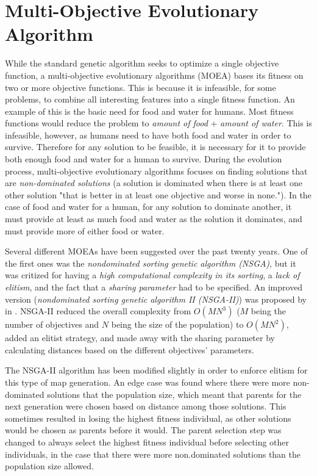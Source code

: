 \section{Multi-Objective Evolutionary Algorithm}
\label{methodology_moea}
While the standard genetic algorithm seeks to optimize a single objective function, a multi-objective evolutionary algorithms (MOEA) bases its fitness on two or more objective functions. This is because it is infeasible, for some problems, to combine all interesting features into a single fitness function. An example of this is the basic need for food and water for humans. Most fitness functions would reduce the problem to \textit{amount of food} + \textit{amount of water}. This is infeasible, however, as humans need to have both food and water in order to survive. Therefore for any solution to be feasible, it is necessary for it to provide both enough food and water for a human to survive. During the evolution process, multi-objective evolutionary algorithms focuses on finding solutions that are \textit{non-dominated solutions} (a solution is dominated when there is at least one other solution "that is better in at least one objective and worse in none."\cite{Togelius2013Controllable}). In the case of food and water for a human, for any solution to dominate another, it must provide at least as much food and water as the solution it dominates, and must provide more of either food or water.

Several different MOEAs have been suggested over the past twenty years\cite{Deb2001Multi, Fonseca1993Genetic, Srinivas1994Muiltiobjective}. One of the first ones was the \textit{nondominated sorting genetic algorithm (NSGA)}\cite{Srinivas1994Muiltiobjective}, but it was critized for having a \textit{high computational complexity in its sorting}, a \textit{lack of elitism}, and the fact that a \textit{sharing parameter} had to be specified. An improved version (\textit{nondominated sorting genetic algorithm II (NSGA-II)}) was proposed by \citeauthor{Deb2000Fast}\cite{Deb2000Fast} in \citeyear{Deb2000Fast}. NSGA-II reduced the overall complexity from $O(M N^3)$ ($M$ being the number of objectives and $N$ being the size of the population) to $O(M N^2)$, added an elitist strategy, and made away with the sharing parameter by calculating distances based on the different objectives' parameters.

The NSGA-II algorithm has been modified slightly in order to enforce elitism for this type of map generation. An edge case was found where there were more non-dominated solutions that the population size, which meant that parents for the next generation were chosen based on distance among those solutions. This sometimes resulted in losing the highest fitness individual, as other solutions would be chosen as parents before it would. The parent selection step was changed to always select the highest fitness individual before selecting other individuals, in the case that there were more non.dominated solutions than the population size allowed.

